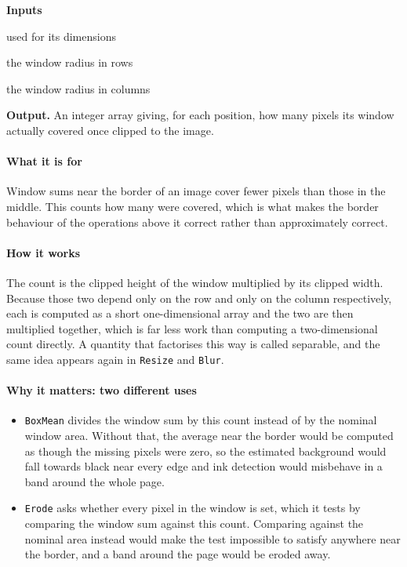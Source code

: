 \noindent\textbf{Inputs}
\begin{description}[leftmargin=2.2em,style=nextline,font=\normalfont\ttfamily]\setlength\itemsep{1pt}
  \item[{shape or array}] \normalfont used for its dimensions
  \item[{ry}] \normalfont the window radius in rows
  \item[{rx}] \normalfont the window radius in columns
\end{description}

\noindent\textbf{Output.} An integer array giving, for each position, how many pixels its window actually covered once clipped to the image.


\paragraph{What it is for}
Window sums near the border of an image cover fewer pixels than those in the middle. This counts how many were covered, which is what makes the border behaviour of the operations above it correct rather than approximately correct.


\paragraph{How it works}
The count is the clipped height of the window multiplied by its clipped width. Because those two depend only on the row and only on the column respectively, each is computed as a short one-dimensional array and the two are then multiplied together, which is far less work than computing a two-dimensional count directly. A quantity that factorises this way is called separable, and the same idea appears again in \texttt{Resize} and \texttt{Blur}.


\paragraph{Why it matters: two different uses}

\begin{itemize}\setlength\itemsep{0pt}
  \item \texttt{BoxMean} divides the window sum by this count instead of by the nominal window area. Without that, the average near the border would be computed as though the missing pixels were zero, so the estimated background would fall towards black near every edge and ink detection would misbehave in a band around the whole page.
  \item \texttt{Erode} asks whether every pixel in the window is set, which it tests by comparing the window sum against this count. Comparing against the nominal area instead would make the test impossible to satisfy anywhere near the border, and a band around the page would be eroded away.
\end{itemize}

